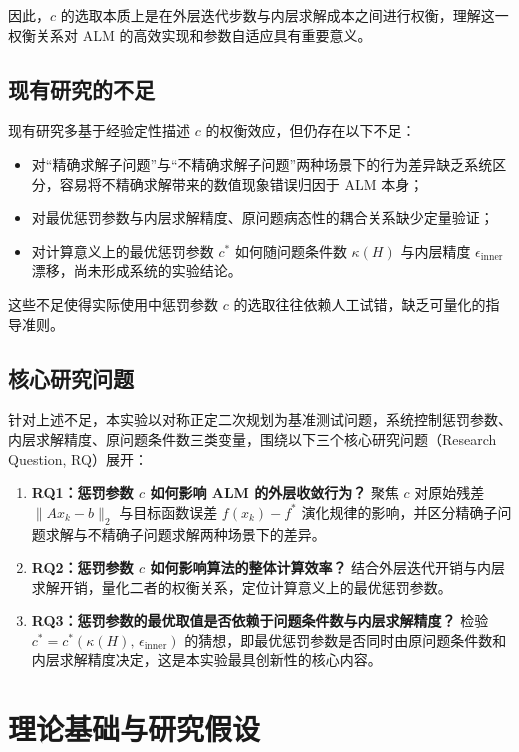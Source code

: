 \documentclass[UTF8]{ctexart}
\numberwithin{figure}{section}
\theoremstyle{definition}
\theoremstyle{examplestyle}
\theoremstyle{remark}
\begin{document}
因此，$c$ 的选取本质上是在外层迭代步数与内层求解成本之间进行权衡，理解这一权衡关系对 ALM 的高效实现和参数自适应具有重要意义。

\subsection{现有研究的不足}
\label{sec:gap}

现有研究多基于经验定性描述 $c$ 的权衡效应，但仍存在以下不足：

\begin{itemize}
\item 对“精确求解子问题”与“不精确求解子问题”两种场景下的行为差异缺乏系统区分，容易将不精确求解带来的数值现象错误归因于 ALM 本身；
\item 对最优惩罚参数与内层求解精度、原问题病态性的耦合关系缺少定量验证；
\item 对计算意义上的最优惩罚参数 $c^*$ 如何随问题条件数 $\kappa(H)$ 与内层精度 $\epsilon_{\mathrm{inner}}$ 漂移，尚未形成系统的实验结论。
\end{itemize}

这些不足使得实际使用中惩罚参数 $c$ 的选取往往依赖人工试错，缺乏可量化的指导准则。

\subsection{核心研究问题}
\label{sec:rqs}

针对上述不足，本实验以对称正定二次规划为基准测试问题，系统控制惩罚参数、内层求解精度、原问题条件数三类变量，围绕以下三个核心研究问题（Research Question, RQ）展开：

\begin{enumerate}
\item \textbf{RQ1：惩罚参数 $c$ 如何影响 ALM 的外层收敛行为？}
聚焦 $c$ 对原始残差 $\|Ax_k-b\|_2$ 与目标函数误差 $f(x_k)-f^*$ 演化规律的影响，并区分精确子问题求解与不精确子问题求解两种场景下的差异。
\item \textbf{RQ2：惩罚参数 $c$ 如何影响算法的整体计算效率？}
结合外层迭代开销与内层求解开销，量化二者的权衡关系，定位计算意义上的最优惩罚参数。
\item \textbf{RQ3：惩罚参数的最优取值是否依赖于问题条件数与内层求解精度？}
检验 $c^*=c^*(\kappa(H),\,\epsilon_{\mathrm{inner}})$ 的猜想，即最优惩罚参数是否同时由原问题条件数和内层求解精度决定，这是本实验最具创新性的核心内容。
\end{enumerate}



\section{理论基础与研究假设}
\label{sec:theory}
\end{document}
